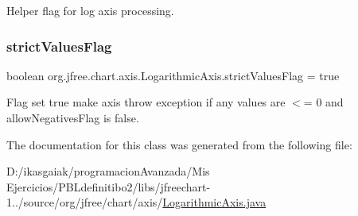 Helper flag for log axis processing. \mbox{\label{classorg_1_1jfree_1_1chart_1_1axis_1_1_logarithmic_axis_a189a8bc6700ef138f70483cc689ee4ed}} 
\subsubsection{\texorpdfstring{strict\+Values\+Flag}{strictValuesFlag}}
{\footnotesize\ttfamily boolean org.\+jfree.\+chart.\+axis.\+Logarithmic\+Axis.\+strict\+Values\+Flag = true\hspace{0.3cm}{\ttfamily [protected]}}

Flag set true make axis throw exception if any values are $<$= 0 and \textquotesingle{}allow\+Negatives\+Flag\textquotesingle{} is false. 

The documentation for this class was generated from the following file\+:\begin{DoxyCompactItemize}
\item 
D\+:/ikasgaiak/programacion\+Avanzada/\+Mis Ejercicios/\+P\+B\+Ldefinitibo2/libs/jfreechart-\/1../source/org/jfree/chart/axis/\mbox{\hyperlink{_logarithmic_axis_8java}{Logarithmic\+Axis.\+java}}\end{DoxyCompactItemize}
